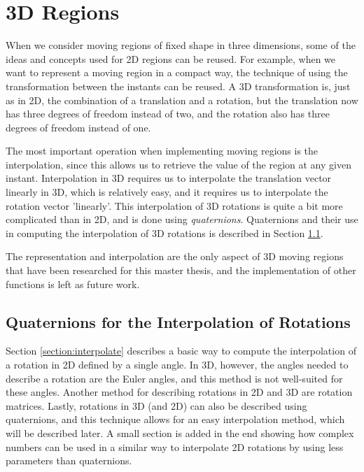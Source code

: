 
\section{3D Regions}
\label{section:3d_regions}

When we consider moving regions of fixed shape in three dimensions, some of the ideas and concepts used for 2D regions can be reused. For example, when we want to represent a moving region in a compact way, the technique of using the transformation between the instants can be reused. A 3D transformation is, just as in 2D, the combination of a translation and a rotation, but the translation now has three degrees of freedom instead of two, and the rotation also has three degrees of freedom instead of one.

The most important operation when implementing moving regions is the interpolation, since this allows us to retrieve the value of the region at any given instant. Interpolation in 3D requires us to interpolate the translation vector linearly in 3D, which is relatively easy, and it requires us to interpolate the rotation vector 'linearly'.  This interpolation of 3D rotations is quite a bit more complicated than in 2D, and is done using \textit{quaternions}. Quaternions and their use in computing the interpolation of 3D rotations is described in Section \ref{section:quaternion_interpolation}.

The representation and interpolation are the only aspect of 3D moving regions that have been researched for this master thesis, and the implementation of other functions is left as future work.

\subsection{Quaternions for the Interpolation of Rotations}
\label{section:quaternion_interpolation}

Section \ref{section:interpolate} describes a basic way to compute the interpolation of a rotation in 2D defined by a single angle. In 3D, however, the angles needed to describe a rotation are the Euler angles, and this method is not well-suited for these angles. Another method for describing rotations in 2D and 3D are rotation matrices. Lastly, rotations in 3D (and 2D) can also be described using quaternions, and this technique allows for an easy interpolation method, which will be described later. A small section is added in the end showing how complex numbers can be used in a similar way to interpolate 2D rotations by using less parameters than quaternions.

